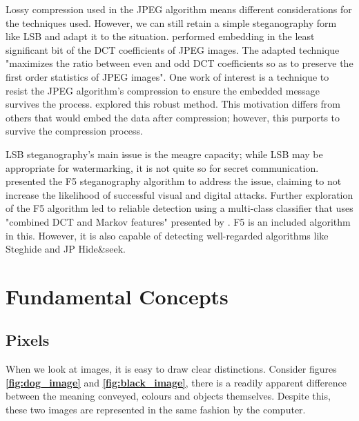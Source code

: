 \documentclass{l4proj}
\begin{document}
Lossy compression used in the JPEG algorithm means different considerations for the techniques used. However, we can still retain a simple steganography form like LSB and adapt it to the situation. \citet{Morsy} performed embedding in the least significant bit of the DCT coefficients of JPEG images. The adapted technique "maximizes the ratio between even and odd DCT coefficients so as to preserve the first order statistics of JPEG images". One work of interest is a technique to resist the JPEG algorithm's compression to ensure the embedded message survives the process. \citet{doi:10.1080/02564602.2018.1476192} explored this robust method. This motivation differs from others that would embed the data after compression; however, this purports to survive the compression process.

LSB steganography's main issue is the meagre capacity; while LSB may be appropriate for watermarking, it is not quite so for secret communication. \citet{westfeld2001f5}  presented the F5 steganography algorithm to address the issue, claiming to not increase the likelihood of successful visual and digital attacks. Further exploration of the F5 algorithm led to reliable detection using a multi-class classifier that uses "combined DCT and Markov features" presented by \citet{10.1117/12.696774}. F5 is an included algorithm in this. However, it is also capable of detecting well-regarded algorithms like Steghide and JP Hide&seek.

\section{Fundamental Concepts}

\subsection{Pixels}

When we look at images, it is easy to draw clear distinctions. Consider figures \textbf{\ref{fig:dog_image}} and \textbf{\ref{fig:black_image}}, there is a readily apparent difference between the meaning conveyed, colours and objects themselves. Despite this, these two images are represented in the same fashion by the computer.
\end{document}
